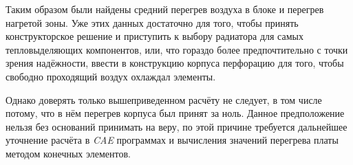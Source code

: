 Таким образом были найдены средний перегрев воздуха в блоке и перегрев
нагретой зоны. Уже этих данных достаточно для того, чтобы принять
конструкторское решение и приступить к выбору радиатора для самых
тепловыделяющих компонентов, или, что гораздо более предпочтительно с
точки зрения надёжности, ввести в конструкцию корпуса перфорацию для
того, чтобы свободно проходящий воздух охлаждал элементы.

Однако доверять только вышеприведенном расчёту не следует,
в том числе потому, что в нём перегрев корпуса был принят за ноль.
Данное предположение нельзя без оснований принимать на веру,
по этой причине требуется дальнейшее уточнение расчёта в \textit{CAE}
программах и вычисления значений перегрева платы методом конечных элементов.












